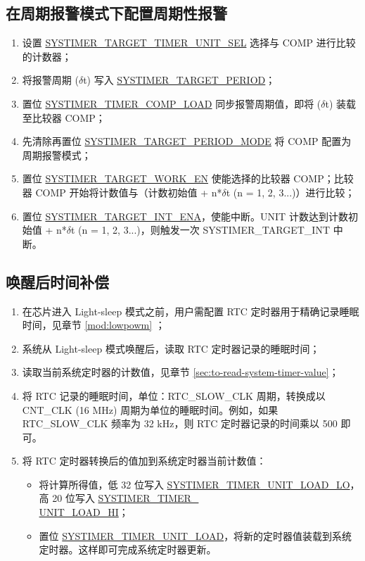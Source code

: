 \documentclass[main\_\_CN.tex]{subfiles}
\begin{document}
\subsection{在周期报警模式下配置周期性报警}
\begin{enumerate}
    \item 设置 \hyperref[fielddesc:SYSTIMERTARGET0TIMERUNITSEL]{SYSTIMER\_TARGET\_TIMER\_UNIT\_SEL} 选择与 COMP 进行比较的计数器；
    \item 将报警周期 ($\delta$t) 写入 \hyperref[fielddesc:SYSTIMERTARGET0PERIOD]{SYSTIMER\_TARGET\_PERIOD}；
    \item 置位 \hyperref[fielddesc:SYSTIMERTIMERCOMP0LOAD]{SYSTIMER\_TIMER\_COMP\_LOAD} 同步报警周期值，即将 ($\delta$t) 装载至比较器 COMP；
    \item 先清除再置位 \hyperref[fielddesc:SYSTIMERTARGET0PERIODMODE]{SYSTIMER\_TARGET\_PERIOD\_MODE} 将 COMP 配置为周期报警模式；
    \item 置位 \hyperref[fielddesc:SYSTIMERTARGET0WORKEN]{SYSTIMER\_TARGET\_WORK\_EN} 使能选择的比较器 COMP；比较器 COMP 开始将计数值与（计数初始值 + n*$\delta$t (n = 1, 2, 3...)）进行比较；
    \item 置位 \hyperref[fielddesc:SYSTIMERTARGET0INTENA]{SYSTIMER\_TARGET\_INT\_ENA}，使能中断。UNIT 计数达到计数初始值 + n*$\delta$t (n = 1, 2, 3...)，则触发一次 SYSTIMER\_TARGET\_INT 中断。
\end{enumerate}


\subsection{唤醒后时间补偿}
\begin{enumerate}
    \item 在芯片进入 Light-sleep 模式之前，用户需配置 RTC 定时器用于精确记录睡眠时间，见章节 \ref{mod:lowpowm} \textit{}；
    \item 系统从 Light-sleep 模式唤醒后，读取 RTC 定时器记录的睡眠时间；
    \item 读取当前系统定时器的计数值，见章节  \ref{sec:to-read-system-timer-value}；
    \item 将 RTC 记录的睡眠时间，单位：RTC\_SLOW\_CLK 周期，转换成以 CNT\_CLK (16 MHz) 周期为单位的睡眠时间。例如，如果 RTC\_SLOW\_CLK 频率为 32 kHz，则 RTC 定时器记录的时间乘以 500 即可。
    \item 将 RTC 定时器转换后的值加到系统定时器当前计数值：
    \begin{itemize}
        \item 将计算所得值，低 32 位写入 \hyperref[fielddesc:SYSTIMERTIMERUNIT0LOADLO]{SYSTIMER\_TIMER\_UNIT\_LOAD\_LO}，高 20 位写入 \hyperref[fielddesc:SYSTIMERTIMERUNIT0LOADHI]{SYSTIMER\_TIMER\_\\UNIT{}\_LOAD\_HI}；
        \item 置位 \hyperref[fielddesc:SYSTIMERTIMERUNIT0LOAD]{SYSTIMER\_TIMER\_UNIT\_LOAD}，将新的定时器值装载到系统定时器。这样即可完成系统定时器更新。
        \end{itemize}
\end{enumerate}
\end{document}

